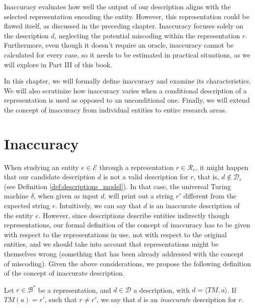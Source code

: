 Inaccuracy evaluates how well the output of our description aligns with the selected representation encoding the entity. However, this representation could be flawed itself, as discussed in the preceding chapter. Inaccuracy focuses solely on the description $d$, neglecting the potential miscoding within the representation $r$. Furthermore, even though it doesn't require an oracle, inaccuracy cannot be calculated for every case, so it needs to be estimated in practical situations, as we will explore in Part III of this book.

In this chapter, we will formally define inaccuracy and examine its characteristics. We will also scrutinize how inaccuracy varies when a conditional description of a representation is used as opposed to an unconditional one. Finally, we will extend the concept of inaccuracy from individual entities to entire research areas.

%
%

\section{Inaccuracy}
\label{sec:inaccuracy:inaccuracy}

When studying an entity $e \in \mathcal{E}$ through a representation $r \in \mathcal{R}_e$, it might happen that our candidate description $d$ is not a valid description for $r$, that is, $d \notin \mathcal{D}_r$ (see Definition \ref{def:descriptions_model}). In that case, the universal Turing machine $\delta$, when given as input $d$, will print out a string $r'$ different from the expected string $r$. Intuitively, we can say that $d$ is an inaccurate description of the entity $e$. However, since descriptions describe entities indirectly though representations, our formal definition of the concept of inaccuracy has to be given with respect to the representations in use, not with respect to the original entities, and we should take into account that representations might be themselves wrong (something that has been already addressed with the concept of miscoding). Given the above considerations, we propose the following definition of the concept of inaccurate description.

\begin{definition}
Let $r \in \mathcal{B}^\ast$ be a representation, and $d \in \mathcal{D}$ a description, with $ d = \langle TM, a \rangle$. If $TM(a) = r'$, such that $r \neq r'$, we say that $d$ is an \emph{inaccurate} description for $r$.
\end{definition}


